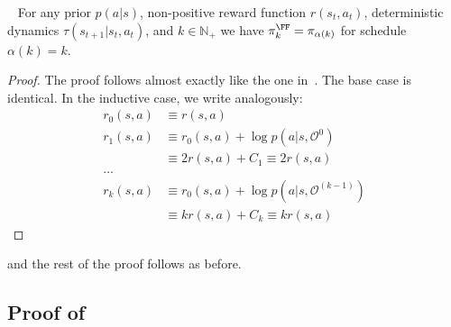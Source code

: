 \begin{lemma}~\label{lemma:equivalence-folding-orig}
    For any prior $p(a|s)$, non-positive reward function $r(s_t,a_t)$, deterministic dynamics $\tau(s_{t+1}|s_t, a_t)$, and $k \in \mathbb{N}_+$ we have $\pi^\FF_{k} = \pi_{\alpha(k)}$ for schedule $\alpha(k) = k$.
\end{lemma}
\begin{proof}
 The proof follows almost exactly like the one in~. The base case is identical. In the inductive case, we write analogously:
\begin{align*}
    r_0(s, a) &\equiv r(s, a) \\
    r_1(s, a) &\equiv r_0(s, a) + \log p(a|s, \mathcal{O}^{0}) \\
    &\equiv 2r(s, a) + C_1 \equiv 2r(s,a) \\
    \dots\\
    r_{k}(s, a) &\equiv r_0(s, a) + \log p(a|s, \mathcal{O}^{(k-1)}) \\
    &\equiv kr(s, a) + C_k \equiv kr(s,a)
    \end{align*}
\end{proof}
and the rest of the proof follows as before.


\subsection{Proof of~}

